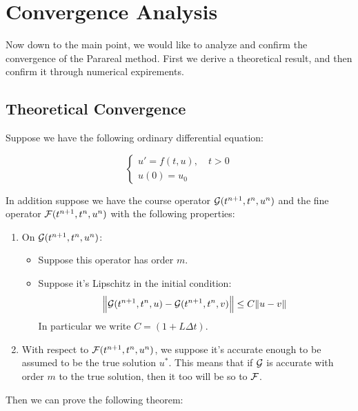 \section{Convergence Analysis}

Now down to the main point, we would like to analyze and confirm the convergence
of the Parareal method. First we derive a theoretical result, and then confirm
it through numerical expirements.

\subsection{Theoretical Convergence}

Suppose we have the following ordinary differential equation:

\begin{equation*}
  \begin{cases}
    u' = f(t,u), \quad t > 0 \\
    u(0) = u_0
  \end{cases}
\end{equation*}

In addition suppose we have the course operator $\mathcal{G}(t^{n+1},t^n,u^n)$ and
the fine operator $\mathcal{F}(t^{n+1}, t^n, u^n)$ with the following properties:

\begin{enumerate}
  \item On $\mathcal{G}(t^{n+1},t^n,u^n)$:
    \begin{itemize}
      \item Suppose this operator has order $m$.
      \item Suppose it's Lipschitz in the initial condition:
        \[
          \norm{\mathcal{G}(t^{n+1},t^n,u)-\mathcal{G}(t^{n+1},t^n,v)} \leq 
          C\norm{u - v} 
        \]
        In particular we write $C = (1 + L \Delta t)$.
    \end{itemize}
  \item With respect to $\mathcal{F}(t^{n+1}, t^n, u^n)$, we suppose it's accurate
    enough to be assumed to be the true solution $u^*$. This means that if
    $\mathcal{G}$ is accurate with order $m$ to the true solution, then it too will
    be so to $\mathcal{F}$.
\end{enumerate}

Then we can prove the following theorem: \cite{balarticle} \cite{fieldstalk}

